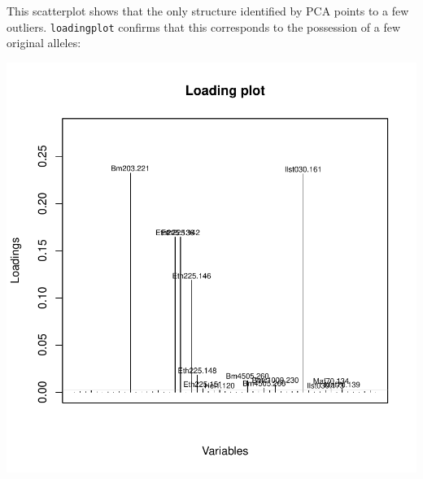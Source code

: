 \documentclass{article}
\begin{document}
\noindent This scatterplot shows that the only structure identified by PCA points to a few outliers.
\texttt{loadingplot} confirms that this corresponds to the possession of a few original alleles:
\begin{Schunk}
\end{Schunk}
\includegraphics{figs/spca-035}
\end{document}
